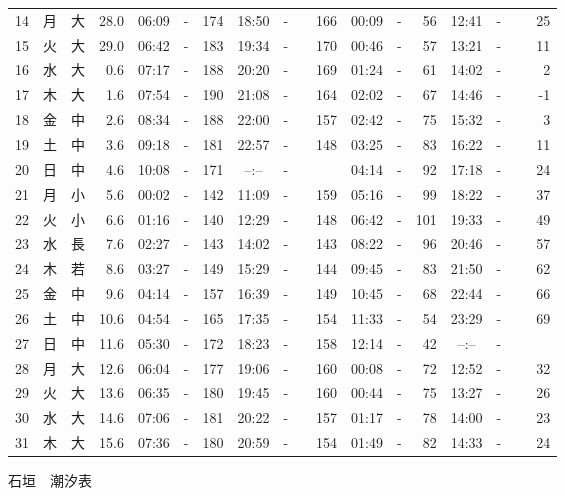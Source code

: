 \documentclass[12pt.a4j]{jsarticle}
\begin{document}
\begin{center}
\begin{table}[ht]
\begin{tabular}{|rc|cr|ccrccr|ccrccr|}
14 & 月 & 大 & 28.0 &  06:09 &-& 174  &  18:50 &-& 166  &   00:09 &-&  56  &   12:41 &-&  25  \\
15 & 火 & 大 & 29.0 &  06:42 &-& 183  &  19:34 &-& 170  &   00:46 &-&  57  &   13:21 &-&  11  \\
16 & 水 & 大 &  0.6 &  07:17 &-& 188  &  20:20 &-& 169  &   01:24 &-&  61  &   14:02 &-&   2  \\
17 & 木 & 大 &  1.6 &  07:54 &-& 190  &  21:08 &-& 164  &   02:02 &-&  67  &   14:46 &-&  -1  \\
18 & 金 & 中 &  2.6 &  08:34 &-& 188  &  22:00 &-& 157  &   02:42 &-&  75  &   15:32 &-&   3  \\
19 & 土 & 中 &  3.6 &  09:18 &-& 181  &  22:57 &-& 148  &   03:25 &-&  83  &   16:22 &-&  11  \\
20 & 日 & 中 &  4.6 &  10:08 &-& 171  &  --:-- &-&~~~~~ &   04:14 &-&  92  &   17:18 &-&  24  \\
21 & 月 & 小 &  5.6 &  00:02 &-& 142  &  11:09 &-& 159  &   05:16 &-&  99  &   18:22 &-&  37  \\
22 & 火 & 小 &  6.6 &  01:16 &-& 140  &  12:29 &-& 148  &   06:42 &-& 101  &   19:33 &-&  49  \\
23 & 水 & 長 &  7.6 &  02:27 &-& 143  &  14:02 &-& 143  &   08:22 &-&  96  &   20:46 &-&  57  \\
24 & 木 & 若 &  8.6 &  03:27 &-& 149  &  15:29 &-& 144  &   09:45 &-&  83  &   21:50 &-&  62  \\
25 & 金 & 中 &  9.6 &  04:14 &-& 157  &  16:39 &-& 149  &   10:45 &-&  68  &   22:44 &-&  66  \\
26 & 土 & 中 & 10.6 &  04:54 &-& 165  &  17:35 &-& 154  &   11:33 &-&  54  &   23:29 &-&  69  \\
27 & 日 & 中 & 11.6 &  05:30 &-& 172  &  18:23 &-& 158  &   12:14 &-&  42  &   --:-- &-&~~~~~ \\
28 & 月 & 大 & 12.6 &  06:04 &-& 177  &  19:06 &-& 160  &   00:08 &-&  72  &   12:52 &-&  32  \\
29 & 火 & 大 & 13.6 &  06:35 &-& 180  &  19:45 &-& 160  &   00:44 &-&  75  &   13:27 &-&  26  \\
30 & 水 & 大 & 14.6 &  07:06 &-& 181  &  20:22 &-& 157  &   01:17 &-&  78  &   14:00 &-&  23  \\
31 & 木 & 大 & 15.6 &  07:36 &-& 180  &  20:59 &-& 154  &   01:49 &-&  82  &   14:33 &-&  24  \\
   \hline
   \end{tabular}
\end{table}
\newpage
 {\LARGE 石垣　潮汐表　　　}

\end{center}
\end{document}
